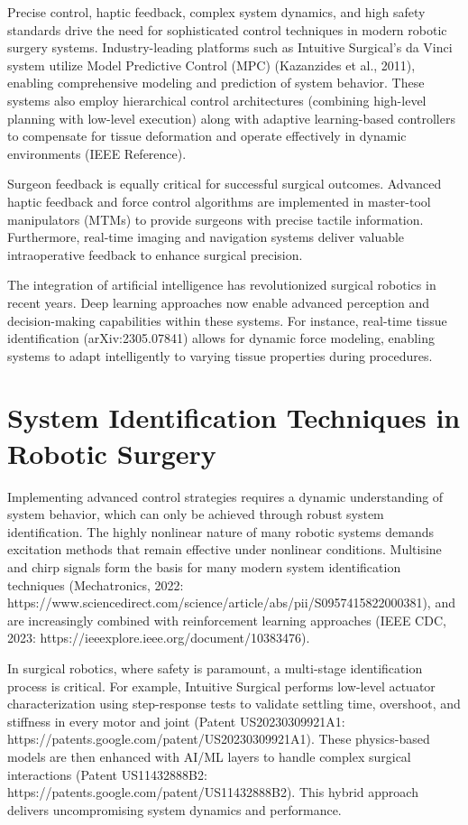 Precise control, haptic feedback, complex system dynamics, and high safety standards drive the need for sophisticated control techniques in modern robotic surgery systems. Industry-leading platforms such as Intuitive Surgical's da Vinci system utilize Model Predictive Control (MPC) (Kazanzides et al., 2011), enabling comprehensive modeling and prediction of system behavior. These systems also employ hierarchical control architectures (combining high-level planning with low-level execution) along with adaptive learning-based controllers to compensate for tissue deformation and operate effectively in dynamic environments (IEEE Reference).

Surgeon feedback is equally critical for successful surgical outcomes. Advanced haptic feedback and force control algorithms are implemented in master-tool manipulators (MTMs) to provide surgeons with precise tactile information. Furthermore, real-time imaging and navigation systems deliver valuable intraoperative feedback to enhance surgical precision.

The integration of artificial intelligence has revolutionized surgical robotics in recent years. Deep learning approaches now enable advanced perception and decision-making capabilities within these systems. For instance, real-time tissue identification (arXiv:2305.07841) allows for dynamic force modeling, enabling systems to adapt intelligently to varying tissue properties during procedures.

\section{System Identification Techniques in Robotic Surgery}

Implementing advanced control strategies requires a dynamic understanding of system behavior, which can only be achieved through robust system identification. The highly nonlinear nature of many robotic systems demands excitation methods that remain effective under nonlinear conditions. Multisine and chirp signals form the basis for many modern system identification techniques (Mechatronics, 2022: https://www.sciencedirect.com/science/article/abs/pii/S0957415822000381), and are increasingly combined with reinforcement learning approaches (IEEE CDC, 2023: https://ieeexplore.ieee.org/document/10383476).

In surgical robotics, where safety is paramount, a multi-stage identification process is critical. For example, Intuitive Surgical performs low-level actuator characterization using step-response tests to validate settling time, overshoot, and stiffness in every motor and joint (Patent US20230309921A1: https://patents.google.com/patent/US20230309921A1). These physics-based models are then enhanced with AI/ML layers to handle complex surgical interactions (Patent US11432888B2: https://patents.google.com/patent/US11432888B2). This hybrid approach delivers uncompromising system dynamics and performance.

